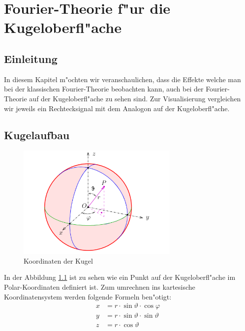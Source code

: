 \chapter{Fourier-Theorie f"ur die Kugeloberfl"ache\label{chapter:kugel}}
\begin{refsection}

\section{Einleitung}

In diesem Kapitel m"ochten wir veranschaulichen, dass die Effekte welche man bei der klassischen Fourier-Theorie beobachten kann, auch bei der Fourier-Theorie auf der Kugeloberfl"ache zu sehen sind. Zur Visualisierung vergleichen wir jeweils ein Rechtecksignal mit dem Analogon auf der Kugeloberfl"ache.
 
\section{Kugelaufbau}

\begin{figure}%
\centering
\includegraphics[width=0.7\textwidth]{kugel/Kugelkoord.pdf}
\caption{Koordinaten der Kugel
\label{skript:Koordinaten der Kugel}}
\end{figure}

In der Abbildung \ref{skript:Koordinaten der Kugel} 
ist zu sehen wie ein Punkt auf der Kugeloberfl"ache im Polar-Koordinaten definiert ist. Zum umrechnen ins kartesische Koordinatensystem werden folgende Formeln ben"otigt:
\begin{align*}
x& = r \cdot \sin\vartheta \cdot \cos\varphi 
\\
y& = r \cdot \sin\vartheta \cdot \sin\vartheta
\\
z& = r \cdot \cos\vartheta 
\end{align*}
 

\end{refsection}

